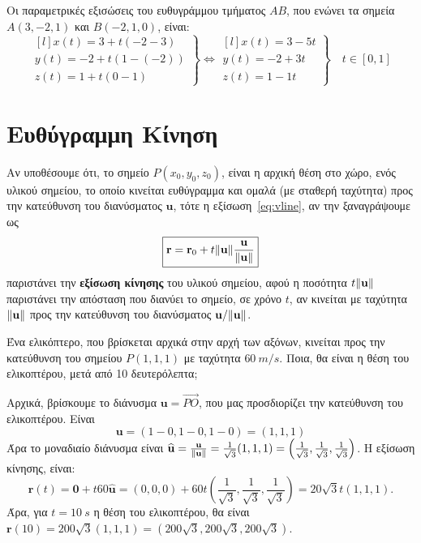 \begin{example}
  Οι παραμετρικές εξισώσεις του ευθυγράμμου τμήματος $ AB $, που ενώνει τα σημεία 
  $ A(3,-2,1) $ και $ B(-2,1,0) $, είναι:
  \[
    \left.
      \begin{matrix*}[l]
        x(t) = 3+t(-2-3) \\
        y(t) = -2+t(1-(-2)) \\
        z(t) = 1+t(0-1)
      \end{matrix*} 
    \right\} \Leftrightarrow 
    \left.
      \begin{matrix*}[l]
        x(t) = 3-5t \\
        y(t) = -2+3t \\
        z(t) = 1-1t
      \end{matrix*} 
    \right\} \quad t \in [0,1]
  \] 
\end{example}


\section*{Ευθύγραμμη Κίνηση}

Αν υποθέσουμε ότι, το σημείο $ P(x_{0}, y_{0}, z_{0}) $, είναι η αρχική θέση στο 
χώρο, ενός υλικού σημείου, το οποίο κινείται ευθύγραμμα και ομαλά (με σταθερή ταχύτητα) 
προς την κατεύθυνση του διανύσματος $ \mathbf{u} $, τότε η εξίσωση~\eqref{eq:vline}, 
αν την ξαναγράψουμε ως
\[
  \boxed{\mathbf{r} = \mathbf{r}_{0} + t \norm{\mathbf{u}}
  \frac{\mathbf{u}}{\norm{\mathbf{u}}}}
\]
παριστάνει την \textbf{εξίσωση κίνησης} του υλικού σημείου, αφού η ποσότητα 
$ t \norm{\mathbf{u}} $ παριστάνει την απόσταση που διανύει το σημείο, σε χρόνο $t$, 
αν κινείται με ταχύτητα $ \norm{\mathbf{u}} $ προς την κατεύθυνση του διανύσματος 
$ \mathbf{u}/ \norm{\mathbf{u}} $.

\begin{example}
  Ένα ελικόπτερο, που βρίσκεται αρχικά στην αρχή των αξόνων, κινείται προς την
  κατεύθυνση του σημείου $P(1,1,1) $ με ταχύτητα $ \SI{60}{m/s} $. Ποια, θα είναι 
  η θέση του ελικοπτέρου, μετά από 10 δευτερόλεπτα;
\end{example}
\begin{solution}
  Αρχικά, βρίσκουμε το διάνυσμα $ \mathbf{u} = \vec{PO} $, που μας προσδιορίζει την
  κατεύθυνση του ελικοπτέρου. Είναι
  \[ \mathbf{u} = (1-0,1-0,1-0) = (1,1,1) \]
  Άρα το μοναδιαίο διάνυσμα είναι $ \mathbf{\widehat{u}} =
  \frac{\mathbf{u}}{\norm{\mathbf{u}}} = \frac{1}{\sqrt{3}} (1,1,1) =
  \left(\frac{1}{\sqrt{3}} , \frac{1}{\sqrt{3}} , \frac{1}{\sqrt{3}}\right) $. Η εξίσωση
  κίνησης, είναι:
  \[
    \mathbf{r}(t) = \mathbf{0} + t 60 \mathbf{\widehat{u}} = (0,0,0) + 60t 
    \left(\frac{1}{\sqrt{3}} , \frac{1}{\sqrt{3}} , \frac{1}{\sqrt{3}}\right) = 
    20 \sqrt{3} t (1,1,1).
  \] 
  Άρα, για $ t= \SI{10}{s} $ η θέση του ελικοπτέρου, θα είναι $ \mathbf{r}(10) = 200
  \sqrt{3} (1,1,1) = (200 \sqrt{3} , 200 \sqrt{3} , 200 \sqrt{3}) $. 
\end{solution}



